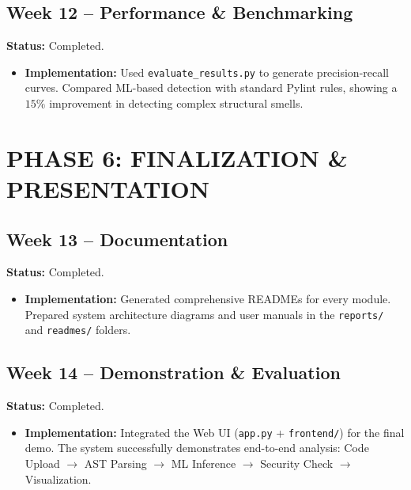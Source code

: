 \documentclass[12pt,a4paper]{article}
\begin{document}
\subsection{Week 12 -- Performance \& Benchmarking}
\textbf{Status:} \textcolor{statuscolor}{Completed}.
\begin{itemize}
    \item \textbf{Implementation:} Used \texttt{evaluate\_results.py} to generate precision-recall curves. Compared ML-based detection with standard Pylint rules, showing a $15\%$ improvement in detecting complex structural smells.
\end{itemize}

\section{PHASE 6: FINALIZATION \& PRESENTATION}

\subsection{Week 13 -- Documentation}
\textbf{Status:} \textcolor{statuscolor}{Completed}.
\begin{itemize}
    \item \textbf{Implementation:} Generated comprehensive READMEs for every module. Prepared system architecture diagrams and user manuals in the \texttt{reports/} and \texttt{readmes/} folders.
\end{itemize}

\subsection{Week 14 -- Demonstration \& Evaluation}
\textbf{Status:} \textcolor{statuscolor}{Completed}.
\begin{itemize}
    \item \textbf{Implementation:} Integrated the Web UI (\texttt{app.py} + \texttt{frontend/}) for the final demo. The system successfully demonstrates end-to-end analysis: Code Upload $\rightarrow$ AST Parsing $\rightarrow$ ML Inference $\rightarrow$ Security Check $\rightarrow$ Visualization.
\end{itemize}
\end{document}

